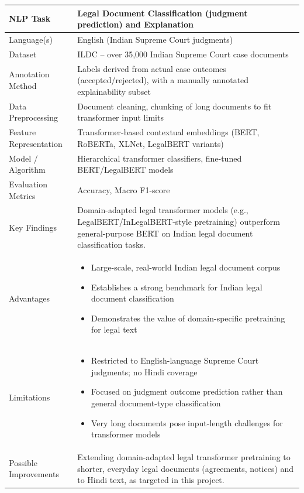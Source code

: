 \begin{longtable}{|p{5cm}|p{10cm}|}
NLP Task &
Legal Document Classification (judgment prediction) and Explanation
\\ \hline

Language(s) &
English (Indian Supreme Court judgments)
\\ \hline

Dataset &
ILDC -- over 35,000 Indian Supreme Court case documents
\\ \hline

Annotation Method &
Labels derived from actual case outcomes (accepted/rejected), with a manually annotated explainability subset
\\ \hline

Data Preprocessing &
Document cleaning, chunking of long documents to fit transformer input limits
\\ \hline

Feature Representation &
Transformer-based contextual embeddings (BERT, RoBERTa, XLNet, LegalBERT variants)
\\ \hline

Model / Algorithm &
Hierarchical transformer classifiers, fine-tuned BERT/LegalBERT models
\\ \hline

Evaluation Metrics &
Accuracy, Macro F1-score
\\ \hline

Key Findings &
Domain-adapted legal transformer models (e.g., LegalBERT/InLegalBERT-style pretraining) outperform general-purpose BERT on Indian legal document classification tasks.
\\ \hline

Advantages &
\begin{itemize}
\item Large-scale, real-world Indian legal document corpus
\item Establishes a strong benchmark for Indian legal document classification
\item Demonstrates the value of domain-specific pretraining for legal text
\end{itemize}
\\ \hline

Limitations &
\begin{itemize}
\item Restricted to English-language Supreme Court judgments; no Hindi coverage
\item Focused on judgment outcome prediction rather than general document-type classification
\item Very long documents pose input-length challenges for transformer models
\end{itemize}
\\ \hline

Possible Improvements &
Extending domain-adapted legal transformer pretraining to shorter, everyday legal documents (agreements, notices) and to Hindi text, as targeted in this project.
\\ \hline

\end{longtable}

